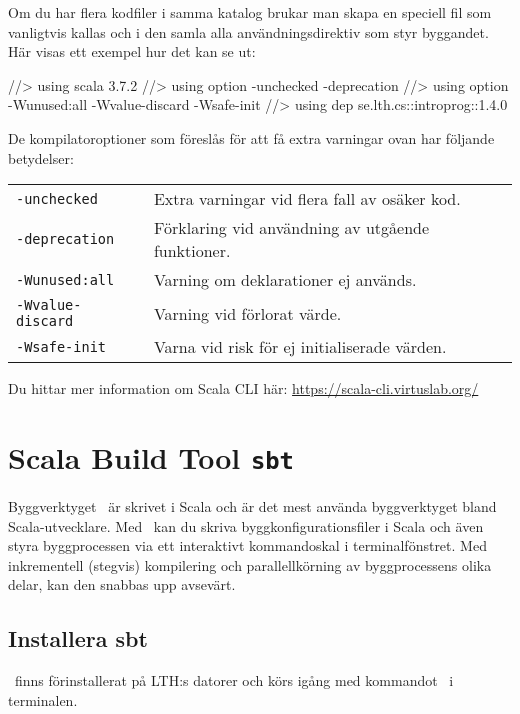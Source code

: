 Om du har flera kodfiler i samma katalog brukar man skapa en speciell fil som vanligtvis kallas  och i den samla alla användningsdirektiv som styr byggandet. Här visas ett exempel hur det kan se ut:
\begin{Code}
//> using scala 3.7.2
//> using option -unchecked -deprecation 
//> using option -Wunused:all -Wvalue-discard -Wsafe-init
//> using dep se.lth.cs::introprog::1.4.0
\end{Code}

\noindent De kompilatoroptioner som föreslås för att få extra varningar ovan har följande betydelser:
\begin{table}[H]
\begin{tabular}{l p{8.5cm}}
\texttt{-unchecked} & Extra varningar vid flera fall av osäker kod. \\
\texttt{-deprecation} & Förklaring vid användning av utgående funktioner. \\
\texttt{-Wunused:all} & Varning om deklarationer ej används. \\
\texttt{-Wvalue-discard} & Varning vid förlorat värde. \\
\texttt{-Wsafe-init} & Varna vid risk för ej initialiserade värden. \\
\end{tabular}
\end{table}

\noindent Du hittar mer information om Scala CLI här: \url{https://scala-cli.virtuslab.org/}



\section{Scala Build Tool \texttt{sbt}}\label{appendix:build:sbt}

Byggverktyget \sbt\ är skrivet i Scala och är det mest använda byggverktyget bland Scala-utvecklare. Med \sbt\ kan du skriva byggkonfigurationsfiler i Scala och även styra byggprocessen via ett interaktivt kommandoskal i terminalfönstret. Med inkrementell (stegvis) kompilering och parallellkörning av byggprocessens olika delar, kan den snabbas upp avsevärt.


\subsection{Installera sbt}

\sbt\ finns förinstallerat på LTH:s datorer och körs igång med kommandot \sbt\ i terminalen.

